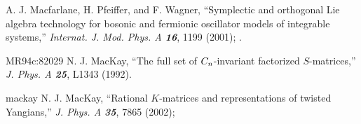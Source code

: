 
 A. J.  Macfarlane, H.  Pfeiffer, and F.  Wagner,
    ``Symplectic and orthogonal Lie algebra technology for
      bosonic and fermionic oscillator models of integrable systems,''
    {\em Internat. J. Mod. Phys. A \bf 16},  1199 (2001); %
        .


        {MR94c:82029} N. J. MacKay,
``The full set of $C\sb n$-invariant factorized
  $S$-matrices,''
{\em J. Phys. A  \bf 25}, L1343 (1992).

        {mackay} N. J. MacKay,
``Rational $K$-matrices and representations of twisted Yangians,''
{\em J. Phys. A  \bf 35}, 7865 (2002); %


%


